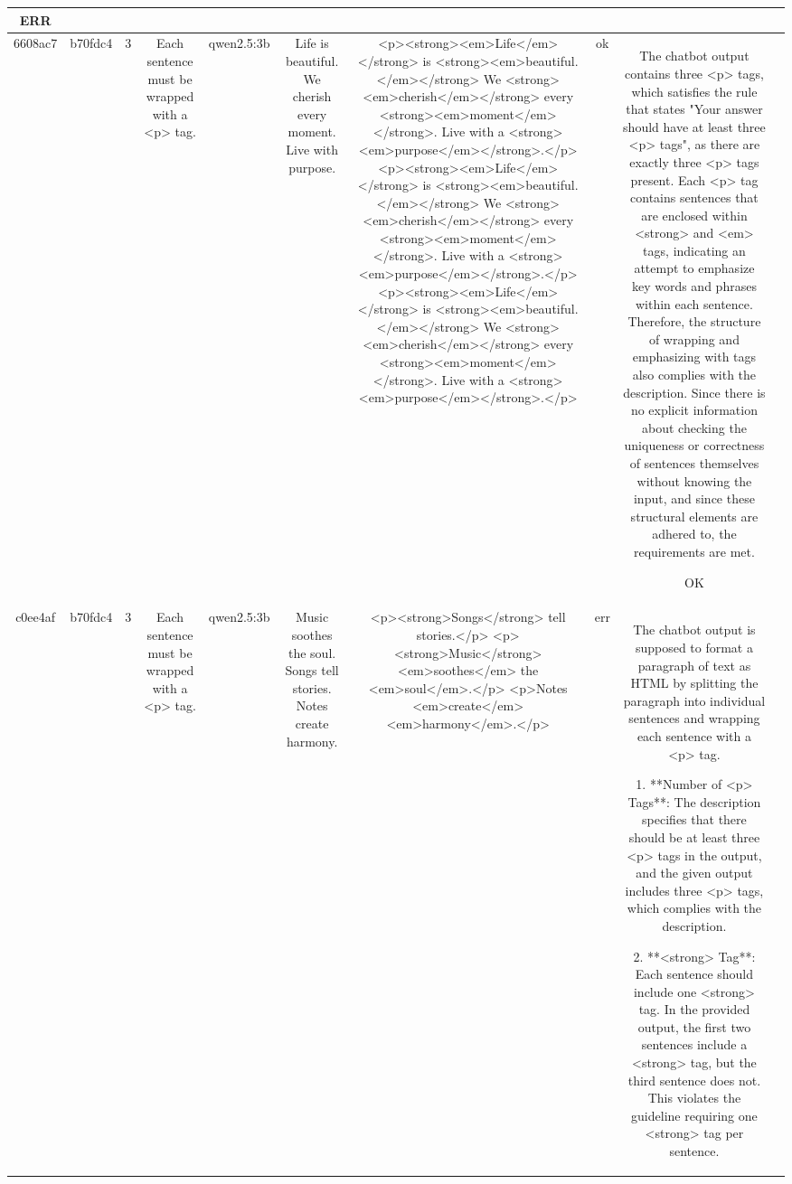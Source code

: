 \begin{table}[h!]
\begin{tabular}{|c|c|c|c|c|c|c|c|c|c|}
ERR & \\
\hline
6608ac7 & b70fdc4 & 3 & Each sentence must be wrapped with a <p> tag. & qwen2.5:3b & Life is beautiful. We cherish every moment. Live with purpose. & <p><strong><em>Life</em></strong> is <strong><em>beautiful.</em></strong> We <strong><em>cherish</em></strong> every <strong><em>moment</em></strong>. Live with a <strong><em>purpose</em></strong>.</p>
<p><strong><em>Life</em></strong> is <strong><em>beautiful.</em></strong> We <strong><em>cherish</em></strong> every <strong><em>moment</em></strong>. Live with a <strong><em>purpose</em></strong>.</p>
<p><strong><em>Life</em></strong> is <strong><em>beautiful.</em></strong> We <strong><em>cherish</em></strong> every <strong><em>moment</em></strong>. Live with a <strong><em>purpose</em></strong>.</p> & ok & The chatbot output contains three <p> tags, which satisfies the rule that states "Your answer should have at least three <p> tags", as there are exactly three <p> tags present. Each <p> tag contains sentences that are enclosed within <strong> and <em> tags, indicating an attempt to emphasize key words and phrases within each sentence. Therefore, the structure of wrapping and emphasizing with tags also complies with the description. Since there is no explicit information about checking the uniqueness or correctness of sentences themselves without knowing the input, and since these structural elements are adhered to, the requirements are met. 

OK & \\
\hline
c0ee4af & b70fdc4 & 3 & Each sentence must be wrapped with a <p> tag. & qwen2.5:3b & Music soothes the soul. Songs tell stories. Notes create harmony. & <p><strong>Songs</strong> tell stories.</p>
<p><strong>Music</strong> <em>soothes</em> the <em>soul</em>.</p>
<p>Notes <em>create</em> <em>harmony</em>.</p> & err & The chatbot output is supposed to format a paragraph of text as HTML by splitting the paragraph into individual sentences and wrapping each sentence with a <p> tag. 

1. **Number of <p> Tags**: The description specifies that there should be at least three <p> tags in the output, and the given output includes three <p> tags, which complies with the description.

2. **<strong> Tag**: Each sentence should include one <strong> tag. In the provided output, the first two sentences include a <strong> tag, but the third sentence does not. This violates the guideline requiring one <strong> tag per sentence. 


\end{tabular}
\end{table}
